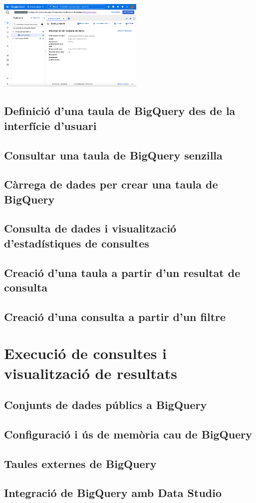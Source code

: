 \documentclass[12pt,longbibliography]{article}
\theoremstyle{definition}
\theoremstyle{remark}
\begin{document}
\begin{center}
\includegraphics[width=7cm]{bq5}
\end{center}



\subsection{Definició d'una taula de BigQuery des de la interfície d'usuari}

\subsection{Consultar una taula de BigQuery senzilla}

\subsection{Càrrega de dades per crear una taula de BigQuery}

\subsection{Consulta de dades i visualització d'estadístiques de consultes}

\subsection{Creació d'una taula a partir d'un resultat de consulta}

\subsection{Creació d'una consulta a partir d'un filtre}

\newpage

\section{Execució de consultes i visualització de resultats}

\subsection{Conjunts de dades públics a BigQuery}

\subsection{Configuració i ús de memòria cau de BigQuery}

\subsection{Taules externes de BigQuery}

\subsection{Integració de BigQuery amb Data Studio}

\newpage
\end{document}
